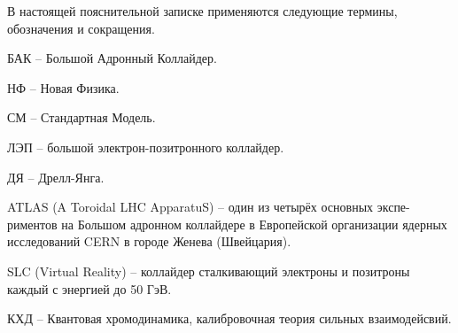 В настоящей пояснительной записке применяются следующие термины, обозначения и сокращения.

БАК -- Большой Адронный Коллайдер.

НФ -- Новая Физика.

СМ -- Стандартная Модель.

ЛЭП -- большой электрон-позитронного коллайдер.

ДЯ -- Дрелл-Янга.

ATLAS (A Toroidal LHC ApparatuS) -- один из четырёх основных экспе-риментов на Большом адронном коллайдере в Европейской организации ядерных исследований CERN в городе Женева (Швейцария).

SLC (Virtual Reality) -- коллайдер сталкивающий электроны и позитроны каждый с энергией до 50 ГэВ.

КХД -- Квантовая хромодинамика, калибровочная теория сильных взаимодейсвий.